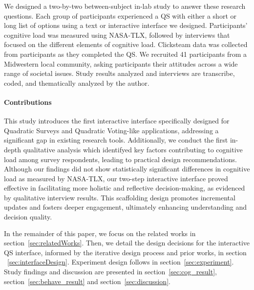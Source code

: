 We designed a two-by-two between-subject in-lab study to answer these research questions. Each group of participants experienced a QS with either a short or long list of options using a text or interactive interface we designed. Participants' cognitive load was measured using NASA-TLX, followed by interviews that focused on the different elements of cognitive load. Clicksteam data was collected from participants as they completed the QS. We recruited 41 participants from a Midwestern local community, asking participants their attitudes across a wide range of societal issues. Study results analyzed and interviews are transcribe, coded, and thematically analyzed by the author.

\paragraph{Contributions}
This study introduces the first interactive interface specifically designed for Quadratic Surveys and Quadratic Voting-like applications, addressing a significant gap in existing research tools. Additionally, we conduct the first in-depth qualitative analysis which identifyed key factors contributing to cognitive load among survey respondents, leading to practical design recommendations. Although our findings did not show statistically significant differences in cognitive load as measured by NASA-TLX, our two-step interactive interface proved effective in facilitating more holistic and reflective decision-making, as evidenced by qualitative interview results. This scaffolding design promotes incremental updates and fosters deeper engagement, ultimately enhancing understanding and decision quality.


In the remainder of this paper, we focus on the related works in section~\ref{sec:relatedWorks}. Then, we detail the design decisions for the interactive QS interface, informed by the iterative design process and prior works, in section ~\ref{sec:interfaceDesign}. Experiment design follows in section~\ref{sec:experiment}. Study findings and discussion are presented in section~\ref{sec:cog_result}, section~\ref{sec:behave_result} and section~\ref{sec:discussion}.



